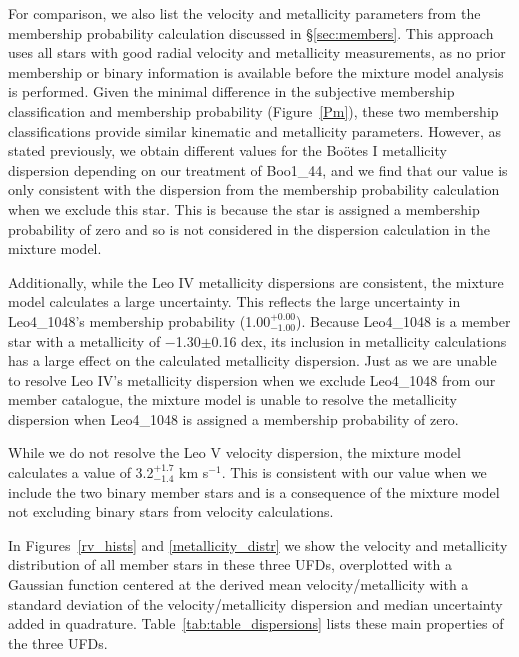 \documentclass[twocolumn]{aastex63}
\begin{document}
For comparison, we also list the velocity and metallicity parameters from the membership probability calculation discussed in \S\ref{sec:members}. This approach uses all stars with good radial velocity and metallicity measurements, as no prior membership or binary information is available before the mixture model analysis is performed. Given the minimal difference in the subjective membership classification and membership probability (Figure~\ref{Pm}), these two membership classifications provide similar kinematic and metallicity parameters. 
However, as stated previously, we obtain different values for the Bo{\"o}tes I metallicity dispersion depending on our treatment of Boo1\_44, and we find that our value is only consistent with the dispersion from the membership probability calculation when we exclude this star. This is because the star is assigned a membership probability of zero and so is not considered in the dispersion calculation in the mixture model. 

Additionally, while the Leo IV metallicity dispersions are consistent, the mixture model calculates a large uncertainty. This reflects the large uncertainty in Leo4\_1048's membership probability (1.00$^{+0.00}_{-1.00}$). Because Leo4\_1048 is a member star with a metallicity of $-$1.30$\pm$0.16 dex, its inclusion in metallicity calculations has a large effect on the calculated metallicity dispersion. Just as we are unable to resolve Leo IV's metallicity dispersion when we exclude Leo4\_1048 from our member catalogue, the mixture model is unable to resolve the metallicity dispersion when Leo4\_1048 is assigned a membership probability of zero. 

While we do not resolve the Leo V velocity dispersion, the mixture model calculates a value of 3.2$^{+1.7}_{-1.4}$ km s$^{-1}$. This is consistent with our value when we include the two binary member stars and is a consequence of the mixture model not excluding binary stars from velocity calculations. 

In Figures~\ref{rv_hists} and \ref{metallicity_distr} we show the velocity and metallicity distribution of all member stars in these three UFDs, overplotted with a Gaussian function centered at the derived mean velocity/metallicity with a standard deviation of the velocity/metallicity dispersion and median uncertainty added in quadrature. Table~\ref{tab:table_dispersions} lists these main properties of the three UFDs.


\end{document}
